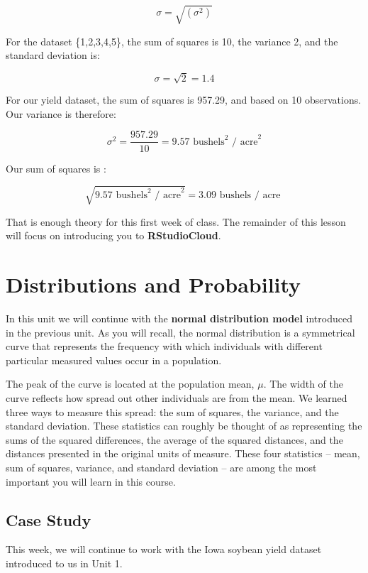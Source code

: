 \documentclass[
]{book}
\begin{document}
\[\sigma = \sqrt{(\sigma^2)}\]

For the dataset \{1,2,3,4,5\}, the sum of squares is 10, the variance 2,
and the standard deviation is:

\[\sigma = \sqrt{2} = 1.4 \]

For our yield dataset, the sum of squares is 957.29, and based on 10
observations. Our variance is therefore:

\[\sigma^2 = \frac{957.29}{10} = 9.57 \text{ bushels}^2 \text{ / acre}^2\]

Our sum of squares is :

\[ \sqrt{9.57 \text{ bushels}^2 \text{ / acre}^2} = 3.09
\text{ bushels / acre } \]

That is enough theory for this first week of class. The remainder of
this lesson will focus on introducing you to \textbf{RStudioCloud}.

\hypertarget{distributions-and-probability}{%
\chapter{Distributions and Probability}\label{distributions-and-probability}}

In this unit we will continue with the \textbf{normal distribution model} introduced in the previous unit. As you will recall, the normal distribution is a symmetrical curve that represents the frequency with which individuals with different particular measured values occur in a population.

The peak of the curve is located at the population mean, \(\mu\). The width of the curve reflects how spread out other individuals are from the mean. We learned three ways to measure this spread: the sum of squares, the variance, and the standard deviation. These statistics can roughly be thought of as representing the sums of the squared differences, the average of the squared distances, and the distances presented in the original units of measure. These four statistics -- mean, sum of squares, variance, and standard deviation -- are among the most important you will learn in this course.

\hypertarget{case-study}{%
\section{Case Study}\label{case-study}}

This week, we will continue to work with the Iowa soybean yield dataset introduced to us in Unit 1.
\end{document}
